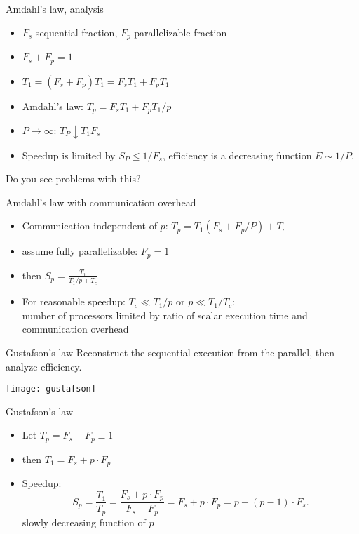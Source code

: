 \begin{numberedframe}{Amdahl's law, analysis}
  \begin{itemize}
  \item $F_s$ sequential fraction, $F_p$ parallelizable fraction
  \item $F_s+F_p=1$
  \item $T_1 = (F_s+F_p)T_1 = F_sT_1 + F_pT_1 $
  \item Amdahl's law: $T_p = F_sT_1 + F_pT_1/p $
  \item $P\rightarrow\infty$: $T_P\downarrow T_1F_s$
  \item Speedup is limited by $S_P\leq 1/F_s$,
    efficiency is a decreasing function $E\sim 1/P$.
  \end{itemize}  
  Do you see problems with this?
\end{numberedframe}

\begin{numberedframe}{Amdahl's law with communication overhead}
  \begin{itemize}
  \item Communication independent of $p$: $T_p= T_1(F_s+F_p/P) +T_c$
  \item assume fully parallelizable: $F_p=1$
  \item then  $S_p=\frac{T_1}{T_1/p+T_c}$
  \item For reasonable speedup: $T_c\ll T_1/p$ or $p\ll
    T_1/T_c$:\\ number of processors limited by ratio of scalar
    execution time and communication overhead
  \end{itemize}
\end{numberedframe}

\begin{numberedframe}{Gustafson's law}
  Reconstruct the sequential execution from the parallel, then analyze efficiency.

  \texttt{[image: gustafson]}
\end{numberedframe}

\begin{numberedframe}{Gustafson's law}
  \begin{itemize}
  \item Let $T_p=F_s+F_p\equiv 1$
  \item then $T_1=F_s+p\cdot F_p$
  \item Speedup: \[ S_p=\frac{T_1}{T_p}=\frac{F_s+p\cdot F_p}{F_s+F_p}
    = F_s+p\cdot F_p = p-(p-1)\cdot F_s. 
    \]
    slowly decreasing function of $p$
  \end{itemize}
\end{numberedframe}


